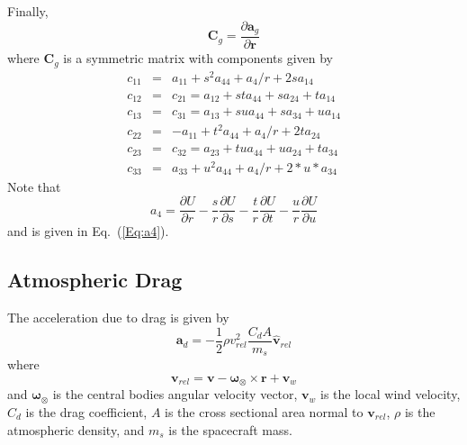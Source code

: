 Finally,
%
\begin{equation}
   \mathbf{C}_g = \frac{\partial \mathbf{a}_g}{\partial \mathbf{r}}
\end{equation}
%
where $\mathbf{C}_g$ is a symmetric matrix with components given by
%
\begin{eqnarray}
   c_{11} & = & a_{11} + s^2a_{44} + a_4/r + 2sa_{14} \\
%
   c_{12} & = & c_{21} = a_{12}+ sta_{44} + sa_{24} + ta_{14}\\
%
   c_{13} & = & c_{31} = a_{13}+ sua_{44} + sa_{34} + ua_{14}\\
%
   c_{22} & = & -a_{11} +t^2a_{44} + a_4/r +2ta_{24}\\
%
   c_{23} & = & c_{32} = a_{23} + tua_{44} + ua_{24} + ta_{34}\\
%
   c_{33} & = & a_{33} + u^2a_{44} + a_4/r + 2*u*a_{34}
\end{eqnarray}
%
Note that
%
\begin{equation}
    a_4 = \frac{\partial U}{\partial r} - \frac{s}{r}\frac{\partial U}{\partial s}
    -\frac{t}{r}\frac{\partial U}{\partial t} -\frac{u}{r}\frac{\partial U}{\partial u}
\end{equation}
%
and is given in Eq.~(\ref{Eq:a4}).



\subsection{Atmospheric Drag}

The acceleration due to drag is given by
%
\begin{equation}
  \mathbf{a}_d = - \displaystyle\frac{1}{2}\rho v_{rel}^2 \displaystyle\frac{C_d
   A}{m_s}\hat{\mathbf{v}}_{rel}
\end{equation}
%
where
%
\begin{equation}
    \mathbf{v}_{rel} = \mathbf{v} - \boldsymbol{\omega}_\otimes \times
    \mathbf{r} + \mathbf{v}_w
\end{equation}
%
and $\boldsymbol{\omega}_\otimes$ is the central bodies angular velocity vector, $\mathbf{v}_w$ is the local wind velocity, $C_d$ is the drag coefficient,
$A$ is the cross sectional area normal to $\mathbf{v}_{rel}$, $\rho$ is the atmospheric
density, and $m_s$ is the
spacecraft mass.

